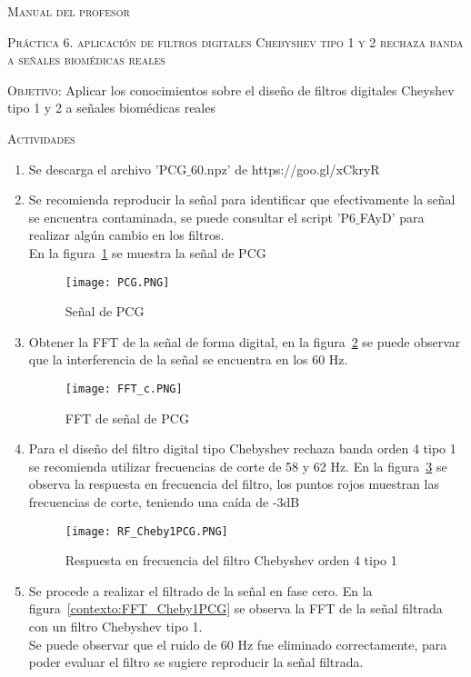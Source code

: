 \documentclass[10pt,letterpaper,spanish,twoside]{report}
\begin{document}
\docdate

\begin{center}
 \textsc{\asignatura}\vspace{.2em}
\end{center}

\textsc{Manual del profesor}

\textsc{Práctica 6. aplicación de filtros digitales Chebyshev  tipo 1 y 2 rechaza banda a señales biomédicas reales}

\textsc{Objetivo:} Aplicar los conocimientos sobre el diseño de filtros digitales Cheyshev tipo 1 y 2 a señales biomédicas reales 

\textsc{Actividades}
\begin{enumerate}
 \item Se descarga el archivo 'PCG$\_$60.npz' de https://goo.gl/xCkryR
 \item Se recomienda reproducir la señal para identificar que efectivamente la señal se encuentra contaminada, se puede consultar el script 'P6$\_$FAyD' para realizar algún cambio en los filtros.\\En la figura~\ref{contexto:PCG} se muestra la señal de PCG
 \begin{figure}[H]
  \centering
  \texttt{[image: PCG.PNG]}
  \caption{Señal de PCG}
  \label{contexto:PCG}
 \end{figure}
 \item Obtener la FFT de la señal de forma digital, en la figura~\ref{contexto:FFT_PCG} se puede observar que la interferencia de la señal se encuentra en los 60 Hz.
 \begin{figure}[H]
  \centering
  \texttt{[image: FFT\_c.PNG]}
  \caption{FFT de señal de PCG}
  \label{contexto:FFT_PCG}
 \end{figure}
 \item Para el diseño del filtro digital tipo Chebyshev rechaza banda orden 4 tipo 1 se recomienda utilizar frecuencias de corte de 58 y 62 Hz. En la figura~\ref{contexto:RF_Cheby1PCG} se observa la respuesta en frecuencia del filtro, los puntos rojos muestran las frecuencias de corte, teniendo una caída de -3dB
 \begin{figure}[H]
  \centering
  \texttt{[image: RF\_Cheby1PCG.PNG]}
  \caption{Respuesta en frecuencia del filtro Chebyshev orden 4 tipo 1}
  \label{contexto:RF_Cheby1PCG}
 \end{figure}
 \item Se procede a realizar el filtrado de la señal en fase cero. En la figura~\ref{contexto:FFT_Cheby1PCG} se observa la FFT de la señal filtrada con un filtro Chebyshev tipo 1.\\Se puede observar que el ruido de 60 Hz fue eliminado correctamente, para poder evaluar el filtro se sugiere reproducir la señal filtrada.

\end{enumerate}
\end{document}
